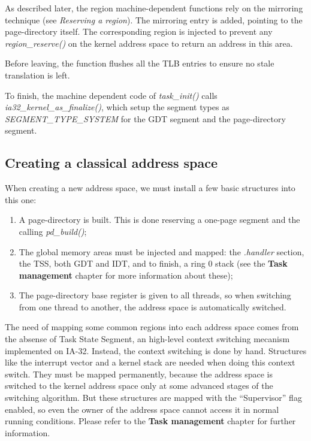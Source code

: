 As described later, the region machine-dependent functions rely on the
mirroring technique (see \textit{Reserving a region}). The mirroring
entry is added, pointing to the page-directory itself. The
corresponding region is injected to prevent any
\textit{region\_reserve()} on the kernel address space to return an
address in this area.

Before leaving, the function flushes all the TLB entries to ensure no
stale translation is left.

To finish, the machine dependent code of \textit{task\_init()} calls
\textit{ia32\_kernel\_as\_finalize()}, which setup the segment types
as \textit{SEGMENT\_TYPE\_SYSTEM} for the GDT segment and the
page-directory segment.

%
%

\subsection{Creating a classical address space}

When creating a new address space, we must install a few basic
structures into this one:

\begin{enumerate}
\item
  A page-directory is built. This is done reserving a one-page segment
  and the calling \textit{pd\_build()};
\item
  The global memory areas must be injected and mapped: the
  \textit{.handler} section, the TSS, both GDT and IDT, and to finish,
  a ring 0 stack (see the \textbf{Task management} chapter for more
  information about these);
\item
  The page-directory base register is given to all threads, so when
  switching from one thread to another, the address space is
  automatically switched.
\end{enumerate}

The need of mapping some common regions into each address space comes
from the absense of Task State Segment, an high-level context
switching mecanism implemented on IA-32. Instead, the context
switching is done by hand. Structures like the interrupt vector and a
kernel stack are needed when doing this context switch. They must be
mapped permanently, because the address space is switched to the
kernel address space only at some advanced stages of the switching
algorithm. But these structures are mapped with the ``Supervisor''
flag enabled, so even the owner of the address space cannot access it
in normal running conditions. Please refer to the \textbf{Task
management} chapter for further information.


